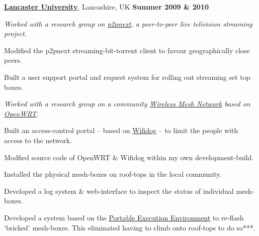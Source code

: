 \documentclass[11pt]{article}
\newenvironment{outerlist}[1][\enskip\textbullet]%
        {\begin{itemize}[#1]}{\end{itemize}%
         \vspace{-.6\baselineskip}}
\newenvironment{innerlist}[1][\enskip\textbullet]%
        {\begin{compactitem}[#1]}{\end{compactitem}}
\begin{document}
%
\href{http://www.lancs.ac.uk/}{\textbf{Lancaster University}},
Lancashire, UK        \hfill \textbf{Summer 2009 \& 2010}
\begin{outerlist}


\item[] \textit{Worked with a research group on \href{p2pnext.com}{p2pnext}, a peer-to-peer live telivision streaming project.}%
\begin{innerlist}
\item Modified the p2pnext streaming-bit-torrent client to favour geographically close peers.
\item Built a user support portal and request system for rolling out streaming set top boxes.
\end{innerlist}
\item[] \textit{Worked with a research group on a community \href{wraynetwrok.com}{Wireless Mesh Network} based on \href{openwrt.com}{OpenWRT}.}%
\begin{innerlist}
\item Built an access-control portal -- based on \href{wifidog.com}{Wifidog} -- to limit the people with access to the network.
\item Modfied source code of OpenWRT \& Wifidog  within my own development-build.

\item Installed the physical mesh-boxes on roof-tops in the local community.
\item Developed a log system \& web-interface to inspect the status of individual mesh-boxes.
\item Developed a system based on the \href{pxe.com}{Portable Execution Environment} to re-flash `bricked' mesh-boxes. This eliminated having to climb onto roof-tops to do so***.

\end{innerlist}
\end{outerlist}
\end{document}
